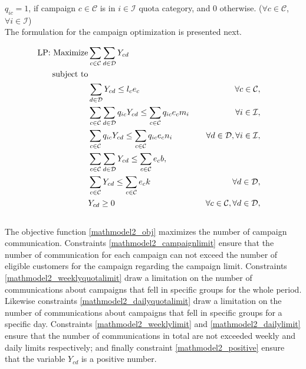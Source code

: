 \documentclass[11pt]{article}
\begin{document}
\noindent $q_{{i}{c}}=1$, if campaign $c \in \mathcal{C}$ is in $i \in \mathcal{I}$ quota category, and 0 otherwise.
($\forall c \in \mathcal{C}$, $\forall i \in \mathcal{I}$)\\

\noindent The formulation for the campaign optimization is presented next.

\begin{align}
\text{LP: }\text{Maximize} & \displaystyle
\sum\limits_{c\in \mathcal{C}}
\sum\limits_{d\in \mathcal{D}}
Y_{{c}{d}} \label{mathmodel2_obj}&
\\
\text{subject to} \notag\\
&\sum\limits_{d\in\mathcal{D}}Y_{{c}{d}} \leq l_{c}  e_{c} &&&\forall c \in \mathcal{C}, \label{mathmodel2_campaignlimit}&\\
&\sum\limits_{c\in\mathcal{C}}\sum\limits_{d\in\mathcal{D}} q_{{i}{c}} Y_{{c}{d}}\leq \sum\limits_{c\in\mathcal{C}}q_{{i}{c}} e_{c}  m_{i} &&&\forall i \in \mathcal{I}, \label{mathmodel2_weeklyquotalimit}&\\
&\sum\limits_{c\in\mathcal{C}}q_{{i}{c}} Y_{{c}{d}} \leq \sum\limits_{c\in\mathcal{C}}q_{{i}{c}} e_{c} n_{i} &&&\forall d \in \mathcal{D}, \forall i \in \mathcal{I}, \label{mathmodel2_dailyquotalimit}&\\
&\sum\limits_{c\in\mathcal{C}}\sum\limits_{d\in\mathcal{D}}Y_{{c}{d}} \leq \sum\limits_{c\in\mathcal{C}}e_{c}  b, \label{mathmodel2_weeklylimit}&\\
&\sum\limits_{c\in\mathcal{C}}Y_{{c}{d}} \leq \sum\limits_{c\in\mathcal{C}}e_{c} k &&&\forall d \in \mathcal{D},\label{mathmodel2_dailylimit}&\\
&Y_{{c}{d}} \geq 0&&&\forall c \in \mathcal{C}, \forall d \in \mathcal{D}, \label{mathmodel2_positive}
\end{align}\\

The objective function \eqref{mathmodel2_obj} maximizes the number of campaign communication. Constraints \eqref{mathmodel2_campaignlimit} ensure that the number of communication for each campaign can not exceed the number of eligible customers for the campaign regarding the campaign limit. Constraints \eqref{mathmodel2_weeklyquotalimit} draw a limitation on the number of communications about campaigns that fell in specific groups for the whole period. Likewise constraints \eqref{mathmodel2_dailyquotalimit} draw a limitation on the number of communications about campaigns that fell in specific groups for a specific day. Constraints \eqref{mathmodel2_weeklylimit} and \eqref{mathmodel2_dailylimit} ensure that the number of communications in total are not exceeded weekly and daily limits respectively; and finally constraint \eqref{mathmodel2_positive} ensure that the variable $Y_{{c}{d}}$ is a positive number.\\
\end{document}
